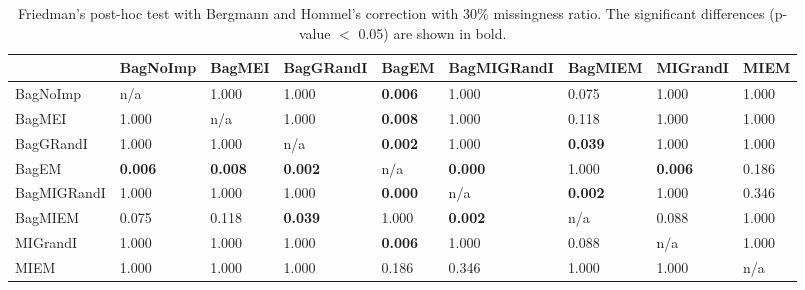 \documentclass{iosart2c}
\begin{document}
\begin{table*}[!ht]
\centering
\caption{Friedman's post-hoc test with Bergmann and Hommel's correction with 30\% missingness ratio. The significant differences (p-value $<$ 0.05) are shown in bold.}
    \begin{tabular}{|l|llllllll|}
    \hline
     & BagNoImp & BagMEI & BagGRandI & BagEM & BagMIGRandI & BagMIEM & MIGrandI & MIEM \\
    \hline
    BagNoImp & n/a & 1.000 & 1.000 & {\bf 0.006} & 1.000 & 0.075 & 1.000 & 1.000 \\
    BagMEI & 1.000 & n/a & 1.000 & {\bf 0.008} & 1.000 & 0.118 & 1.000 & 1.000 \\
    BagGRandI & 1.000 & 1.000 & n/a & {\bf 0.002} & 1.000 & {\bf 0.039} & 1.000 & 1.000 \\
    BagEM & {\bf 0.006} & {\bf 0.008} & {\bf 0.002} & n/a & {\bf 0.000} & 1.000 & {\bf 0.006} & 0.186 \\
    BagMIGRandI & 1.000 & 1.000 & 1.000 & {\bf 0.000} & n/a & {\bf 0.002} & 1.000 & 0.346 \\
    BagMIEM & 0.075 & 0.118 & {\bf 0.039} & 1.000 & {\bf 0.002} & n/a & 0.088 & 1.000 \\
    MIGrandI & 1.000 & 1.000 & 1.000 & {\bf 0.006} & 1.000 & 0.088 & n/a & 1.000 \\
    MIEM & 1.000 & 1.000 & 1.000 & 0.186 & 0.346 & 1.000 & 1.000 & n/a \\
    \hline
    \end{tabular}
    \label{30testing}
\end{table*}
\end{document}
